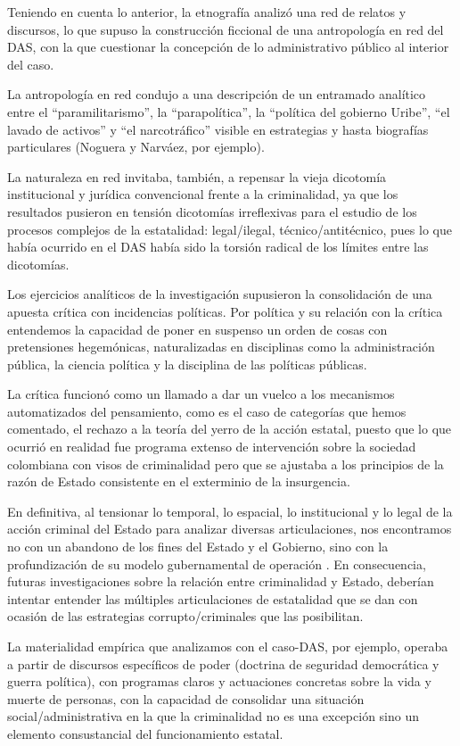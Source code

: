 \documentclass[
  spanish,
  11pt,
  a4paper,
]{scrbook}
\begin{document}
Teniendo en cuenta lo anterior, la etnografía analizó una red de relatos
y discursos, lo que supuso la construcción ficcional de una antropología
en red del DAS, con la que cuestionar la concepción de lo administrativo
público al interior del caso.

La antropología en red condujo a una descripción de un entramado
analítico entre el ``paramilitarismo'', la ``parapolítica'', la
``política del gobierno Uribe'', ``el lavado de activos'' y ``el
narcotráfico'' visible en estrategias y hasta biografías particulares
(Noguera y Narváez, por ejemplo).

La naturaleza en red invitaba, también, a repensar la vieja dicotomía
institucional y jurídica convencional frente a la criminalidad, ya que
los resultados pusieron en tensión dicotomías irreflexivas para el
estudio de los procesos complejos de la estatalidad: legal/ilegal,
técnico/antitécnico, pues lo que había ocurrido en el DAS había sido la
torsión radical de los límites entre las dicotomías.

Los ejercicios analíticos de la investigación supusieron la
consolidación de una apuesta crítica con incidencias políticas. Por
política y su relación con la crítica entendemos la capacidad de poner
en suspenso un orden de cosas con pretensiones hegemónicas,
naturalizadas en disciplinas como la administración pública, la ciencia
política y la disciplina de las políticas públicas.

La crítica funcionó como un llamado a dar un vuelco a los mecanismos
automatizados del pensamiento, como es el caso de categorías que hemos
comentado, el rechazo a la teoría del yerro de la acción estatal, puesto
que lo que ocurrió en realidad fue programa extenso de intervención
sobre la sociedad colombiana con visos de criminalidad pero que se
ajustaba a los principios de la razón de Estado consistente en el
exterminio de la insurgencia.

En definitiva, al tensionar lo temporal, lo espacial, lo institucional y
lo legal de la acción criminal del Estado para analizar diversas
articulaciones, nos encontramos no con un abandono de los fines del
Estado y el Gobierno, sino con la profundización de su modelo
gubernamental de operación \autocite{CastroGomez2010,Foucault1999}. En
consecuencia, futuras investigaciones sobre la relación entre
criminalidad y Estado, deberían intentar entender las múltiples
articulaciones de estatalidad que se dan con ocasión de las estrategias
corrupto/criminales que las posibilitan.

La materialidad empírica que analizamos con el caso-DAS, por ejemplo,
operaba a partir de discursos específicos de poder (doctrina de
seguridad democrática y guerra política), con programas claros y
actuaciones concretas sobre la vida y muerte de personas, con la
capacidad de consolidar una situación social/administrativa en la que la
criminalidad no es una excepción sino un elemento consustancial del
funcionamiento estatal.
\end{document}
